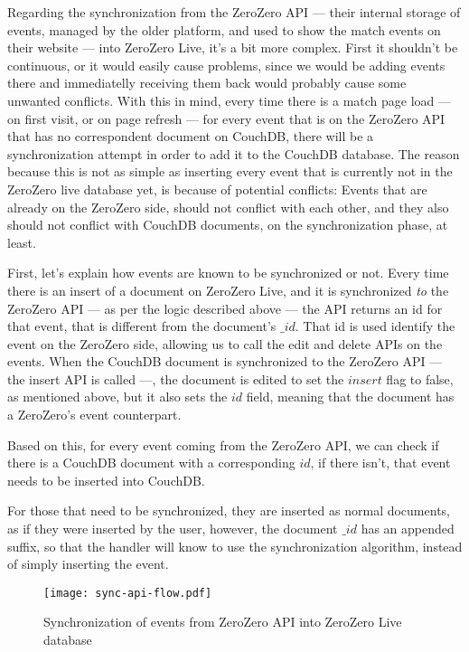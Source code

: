 Regarding the synchronization from the ZeroZero API --- their internal storage of events, managed by the older platform, and used to show the match events on their website --- into ZeroZero Live, it's a bit more complex. First it shouldn't be continuous, or it would easily cause problems, since we would be adding events there and immediatelly receiving them back would probably cause some unwanted conflicts. With this in mind, every time there is a match page load --- on first visit, or on page refresh --- for every event that is on the ZeroZero API that has no correspondent document on CouchDB, there will be a synchronization attempt in order to add it to the CouchDB database. The reason because this is not as simple as inserting every event that is currently not in the ZeroZero live database yet, is because of potential conflicts: Events that are already on the ZeroZero side, should not conflict with each other, and they also should not conflict with CouchDB documents, on the synchronization phase, at least.

First, let's explain how events are known to be synchronized or not. Every time there is an insert of a document on ZeroZero Live, and it is synchronized \textit{to} the ZeroZero API --- as per the logic described above --- the API returns an id for that event, that is different from the document's $\_id$. That id is used identify the event on the ZeroZero side, allowing us to call the edit and delete APIs on the events. When the CouchDB document is synchronized to the ZeroZero API --- the insert API is called ---, the document is edited to set the $insert$ flag to false, as mentioned above, but it also sets the $id$ field, meaning that the document has a ZeroZero's event counterpart.

Based on this, for every event coming from the ZeroZero API, we can check if there is a CouchDB document with a corresponding $id$, if there isn't, that event needs to be inserted into CouchDB.

For those that need to be synchronized, they are inserted as normal documents, as if they were inserted by the user, however, the document $\_id$ has an appended  suffix, so that the handler will know to use the synchronization algorithm, instead of simply inserting the event.

\begin{figure}[h]
    \begin{center}
        \leavevmode
        \texttt{[image: sync-api-flow.pdf]}
        \caption{Synchronization of events from ZeroZero API into ZeroZero Live database}
        \label{fig:sync-from-api-flux}
    \end{center}
\end{figure}

